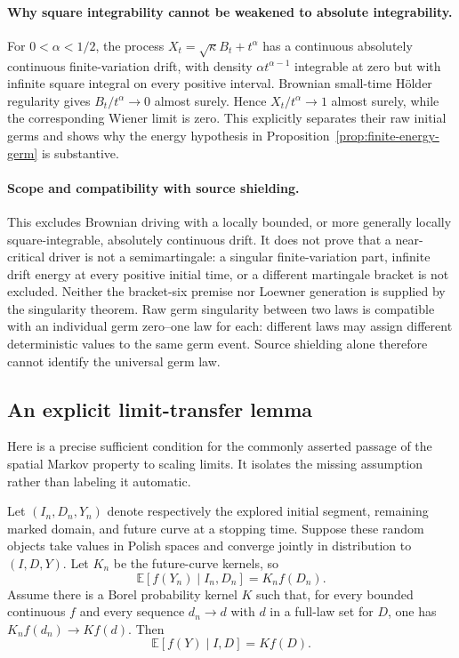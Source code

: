 \documentclass[11pt]{article}
\theoremstyle{definition}\newtheorem{definition}[theorem]{Definition}
\theoremstyle{remark}\newtheorem{remark}[theorem]{Remark}
\begin{document}
\paragraph{Why square integrability cannot be weakened to absolute integrability.}
For $0<\alpha<1/2$, the process
$X_t=\sqrt\kappa B_t+t^\alpha$ has a continuous absolutely continuous
finite-variation drift, with density $\alpha t^{\alpha-1}$ integrable
at zero but with infinite square integral on every positive interval.
Brownian small-time H\"older regularity gives
$B_t/t^\alpha\to0$ almost surely. Hence $X_t/t^\alpha\to1$ almost
surely, while the corresponding Wiener limit is zero. This explicitly
separates their raw initial germs and shows why the energy hypothesis
in Proposition~\ref{prop:finite-energy-germ} is substantive.

\paragraph{Scope and compatibility with source shielding.}
This excludes Brownian driving with a locally bounded, or more generally
locally square-integrable, absolutely continuous drift. It does not prove
that a near-critical driver is not a semimartingale: a singular
finite-variation part, infinite drift energy at every positive initial
time, or a different martingale bracket is not excluded. Neither the
bracket-six premise nor Loewner generation is supplied by the singularity
theorem. Raw germ singularity between two laws is compatible with an
individual germ zero--one law for each: different laws may assign
different deterministic values to the same germ event. Source shielding
alone therefore cannot identify the universal germ law.


\subsection{An explicit limit-transfer lemma}

Here is a precise sufficient condition for the commonly asserted passage of
the spatial Markov property to scaling limits.  It isolates the missing
assumption rather than labeling it automatic.

Let $(I_n,D_n,Y_n)$ denote respectively the explored initial segment, remaining
marked domain, and future curve at a stopping time.  Suppose these random
objects take values in Polish spaces and converge jointly in distribution
to $(I,D,Y)$.  Let $K_n$ be the future-curve kernels, so
\[
 \mathbb E[f(Y_n)\mid I_n,D_n]=K_n f(D_n).
\]
Assume there is a Borel probability kernel $K$ such that, for every bounded
continuous $f$ and every sequence $d_n\to d$ with $d$ in a full-law set for
$D$, one has $K_n f(d_n)\to Kf(d)$.  Then
\[
 \mathbb E[f(Y)\mid I,D]=Kf(D).
\]
\end{document}
